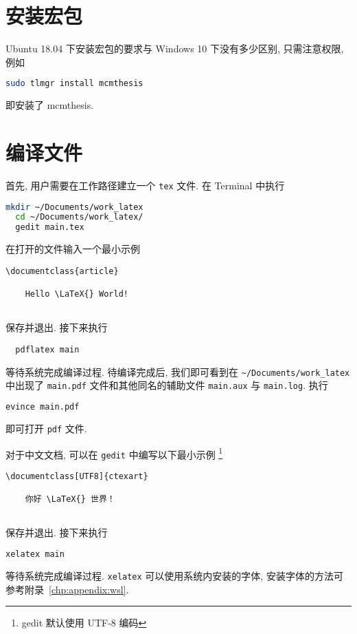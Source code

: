 \section{安装宏包}\label{sec:ubuntu:installpackage}

Ubuntu 18.04 下安装宏包的要求与 Windows 10 下没有多少区别, 只需注意权限, 例如
\begin{lstlisting}[language = bash]
  sudo tlmgr install mcmthesis
\end{lstlisting}
即安装了 mcmthesis.

\section{编译文件}

首先, 用户需要在工作路径建立一个 \texttt{tex} 文件.
在 \textsf{Terminal} 中执行
\begin{lstlisting}[language = bash]
  mkdir ~/Documents/work_latex
  cd ~/Documents/work_latex/
  gedit main.tex
\end{lstlisting}
在打开的文件输入一个最小示例
\begin{lstlisting}[language = {[LaTeX]TeX}]
  \documentclass{article}
  
    Hello \LaTeX{} World!
  
\end{lstlisting}
保存并退出. 
接下来执行
\begin{lstlisting}
  pdflatex main
\end{lstlisting}
等待系统完成编译过程. 
待编译完成后,
我们即可看到在 \texttt{\~{}/Documents/work\_latex} 中出现了
\texttt{main.pdf} 文件和其他同名的辅助文件 \texttt{main.aux} 与
\texttt{main.log}. 
执行
\begin{lstlisting}[language=bash]
  evince main.pdf
\end{lstlisting}
即可打开 \texttt{pdf} 文件.

对于中文文档, 可以在 \texttt{gedit} 中编写以下最小示例%
\footnote{gedit 默认使用 UTF-8 编码}%
\begin{lstlisting}[language={[LaTeX]TeX}]
  \documentclass[UTF8]{ctexart}
  
    你好 \LaTeX{} 世界！
  
\end{lstlisting}
保存并退出.
接下来执行
\begin{lstlisting}[language=bash]
  xelatex main
\end{lstlisting}
等待系统完成编译过程.
\texttt{xelatex} 可以使用系统内安装的字体,
安装字体的方法可参考附录~\ref{chp:appendix:wsl}.

